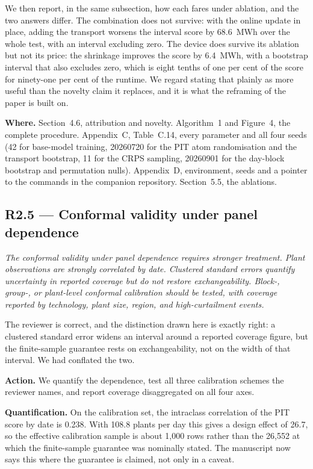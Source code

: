 \documentclass[11pt,a4paper]{article}
\newenvironment{revcomment}
  {\begin{mdframed}[backgroundcolor=quotebg,linecolor=quoterule,linewidth=0.4pt,
    innertopmargin=6pt,innerbottommargin=6pt,skipabove=8pt,skipbelow=8pt]\itshape}
  {\end{mdframed}}
\newcommand{\action}[1]{\textbf{Action.} #1}
\newcommand{\where}[1]{\textbf{Where.} #1}
\begin{document}
We then report, in the same subsection, how each fares under ablation, and the two answers differ. The combination does not survive: with the online update in place, adding the transport worsens the interval score by 68.6~MWh over the whole test, with an interval excluding zero. The device does survive its ablation but not its price: the shrinkage improves the score by 6.4~MWh, with a bootstrap interval that also excludes zero, which is eight tenths of one per cent of the score for ninety-one per cent of the runtime. We regard stating that plainly as more useful than the novelty claim it replaces, and it is what the reframing of the paper is built on.

\where{Section~4.6, attribution and novelty. Algorithm~1 and Figure~4, the complete procedure. Appendix~C, Table~C.14, every parameter and all four seeds (42 for base-model training, 20260720 for the PIT atom randomisation and the transport bootstrap, 11 for the CRPS sampling, 20260901 for the day-block bootstrap and permutation nulls). Appendix~D, environment, seeds and a pointer to the commands in the companion repository. Section~5.5, the ablations.}

\subsection*{R2.5 --- Conformal validity under panel dependence}

\begin{revcomment}
The conformal validity under panel dependence requires stronger treatment. Plant observations are strongly correlated by date. Clustered standard errors quantify uncertainty in reported coverage but do not restore exchangeability. Block-, group-, or plant-level conformal calibration should be tested, with coverage reported by technology, plant size, region, and high-curtailment events.
\end{revcomment}

The reviewer is correct, and the distinction drawn here is exactly right: a clustered standard error widens an interval around a reported coverage figure, but the finite-sample guarantee rests on exchangeability, not on the width of that interval. We had conflated the two.

\action{We quantify the dependence, test all three calibration schemes the reviewer names, and report coverage disaggregated on all four axes.}

\textbf{Quantification.} On the calibration set, the intraclass correlation of the PIT score by date is 0.238. With 108.8 plants per day this gives a design effect of 26.7, so the effective calibration sample is about 1{,}000 rows rather than the 26{,}552 at which the finite-sample guarantee was nominally stated. The manuscript now says this where the guarantee is claimed, not only in a caveat.
\end{document}
